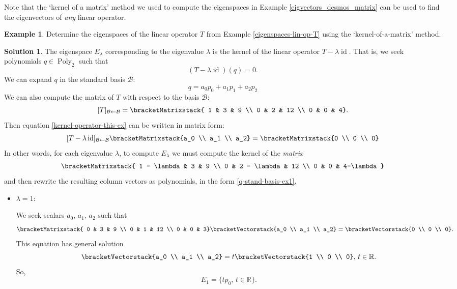 \documentclass[a4paper,11pt]{book}
\theoremstyle{definition}
\newtheorem{example_environment}{Example}[chapter]
\newtheorem*{solution}{Solution}
\newcommand{\basis}[1]{{\mathcal #1}}
\newcommand{\cvector}[1]{\bracketVectorstack{#1}}
\newcommand{\cmatrix}[1]{\bracketMatrixstack{#1}}
\newenvironment{example}
	{
		\begin{oframed} 
		\begin{example_environment}
	}
	{
		\end{example_environment}
		\end{oframed}
	}
\DeclareMathOperator{\Poly}{Poly}
\DeclareMathOperator{\id}{id}
\begin{document}
Note that the `kernel of a matrix' method we used to compute the eigenspaces in Example \ref{eigvectors_desmos_matrix} can be used to find the eigenvectors of {\em any} linear operator.
\begin{example} Determine the eigenspaces of the linear operator $T$ from Example \ref{eigenspaces-lin-op-T} using the `kernel-of-a-matrix' method.

\begin{solution} The eigenspace $E_\lambda$ corresponding to the eigenvalue $\lambda$ is the kernel of the linear operator $T - \lambda \id$. That is, we seek polynomials $q \in \Poly_2$ such that
\begin{equation} \label{kernel-operator-this-ex}
 (T - \lambda \id) (q) = 0.
\end{equation}
We can expand $q$ in the standard basis $\basis{B}$:
\begin{equation} \label{q-stand-basis-ex1}
 q = a_0 p_0 + a_1 p_1 + a_2 p_2
\end{equation}
We can also compute the matrix of $T$ with respect to the basis $\basis{B}$:
\[
 [T]_{\basis{B} \leftarrow \basis{B}} = \cmatrix{ 1 & 3 & 9 \\ 0 & 2 & 12 \\ 0 & 0 & 4}.
\]
Then equation \eqref{kernel-operator-this-ex} can be written in matrix form:
\[
 [T - \lambda \id]_{\basis{B} \leftarrow \basis{B}} \cmatrix{a_0 \\ a_1 \\ a_2} = \cmatrix{0 \\ 0 \\ 0}
\]
In other words, for each eigenvalue $\lambda$, to compute $E_\lambda$ we must compute the kernel of the {\em matrix}
\[
 \cmatrix{ 1 - \lambda & 3 & 9 \\
 0 & 2 - \lambda & 12 \\
 0 & 0 & 4-\lambda}
\]
and then rewrite the resulting column vectors as polynomials, in the form \eqref{q-stand-basis-ex1}.

\begin{itemize}

\item $\lambda = 1$:

We seek scalars $a_0$, $a_1$, $a_2$ such that
\[
 \cmatrix{ 0 & 3 & 9 \\
 0 & 1  & 12 \\
 0 & 0 & 3} \cvector{a_0 \\ a_1 \\ a_2} = \cvector{0 \\ 0 \\ 0}.
\]
This equation has general solution
\[
 \cvector{a_0 \\ a_1 \\ a_2} = t \cvector{1 \\ 0 \\ 0}, \, t \in \mathbb{R}.
\]
So,
\[
 E_1 = \{t p_0, \, t \in \mathbb{R} \}.
\]


\end{itemize}
\end{solution}
\end{example}
\end{document}
